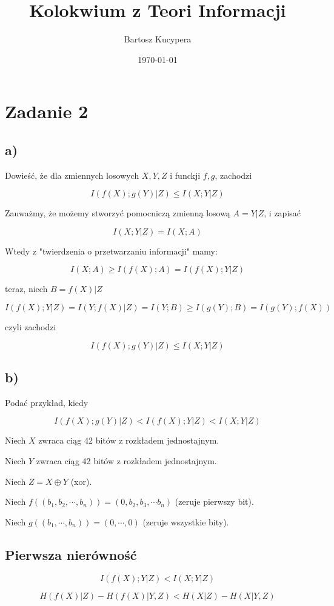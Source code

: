 \documentclass{article}
\title{Kolokwium z Teori Informacji}
\author{Bartosz Kucypera}
\date{\today}
\begin{document}
\maketitle

\section*{Zadanie 2}

\subsection*{a)}
Dowieść, że dla zmiennych losowych $X,Y,Z$ i funckji $f,g$, zachodzi

$$I(f(X);g(Y)|Z) \le I(X;Y|Z)$$

Zauważmy, że możemy stworzyć pomocniczą zmienną losową $A = Y|Z$, i zapisać

$$I(X;Y|Z) = I(X;A)$$

Wtedy z "twierdzenia o przetwarzaniu informacji" mamy:

$$I(X;A) \ge I(f(X);A) = I(f(X);Y|Z)$$

teraz, niech $B = f(X)|Z$

$$ I(f(X);Y|Z) = I(Y;f(X)|Z) = I(Y;B) \ge I(g(Y);B) = I(g(Y);f(X))$$

czyli zachodzi

$$ I(f(X);g(Y)|Z) \le I(X;Y|Z) $$

\subsection*{b)}
Podać przykład, kiedy 

$$ I(f(X);g(Y)|Z) < I(f(X);Y|Z) < I(X;Y|Z) $$

Niech $X$ zwraca ciąg 42 bitów z rozkładem jednostajnym.

Niech $Y$ zwraca ciąg 42 bitów z rozkładem jednostajnym.

Niech $Z= X\oplus Y$ (xor).

Niech $f((b_1, b_2, \cdots, b_n)) = (0, b_2, b_3, \cdots b_n)$ (zeruje pierwszy bit).

Niech $g((b_1, \cdots, b_n)) = (0, \cdots, 0)$ (zeruje wszystkie bity).

\subsection*{Pierwsza nierówność}

$$I(f(X);Y|Z) < I(X;Y|Z)$$

$$H(f(X)|Z) - H(f(X)|Y,Z) < H(X|Z) - H(X|Y,Z)$$
\end{document}
